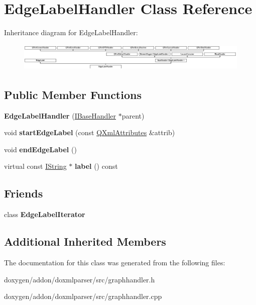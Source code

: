 \hypertarget{class_edge_label_handler}{}\section{Edge\+Label\+Handler Class Reference}
\label{class_edge_label_handler}
Inheritance diagram for Edge\+Label\+Handler\+:\begin{figure}[H]
\begin{center}
\leavevmode
\includegraphics[height=1.350211cm]{class_edge_label_handler}
\end{center}
\end{figure}
\subsection*{Public Member Functions}
\begin{DoxyCompactItemize}
\item 
\mbox{\label{class_edge_label_handler_af3e2f45cca8bea2c749237bd04036a5d}} 
{\bfseries Edge\+Label\+Handler} (\mbox{\hyperlink{class_i_base_handler}{I\+Base\+Handler}} $\ast$parent)
\item 
\mbox{\label{class_edge_label_handler_a30ece7f71374fb1436ad1fb8d0dfdde4}} 
void {\bfseries start\+Edge\+Label} (const \mbox{\hyperlink{class_q_xml_attributes}{Q\+Xml\+Attributes}} \&attrib)
\item 
\mbox{\label{class_edge_label_handler_a4e217720946ac0906a05db16909391b2}} 
void {\bfseries end\+Edge\+Label} ()
\item 
\mbox{\label{class_edge_label_handler_aff13f3bd4f53d9e76e4a0d7350319c7a}} 
virtual const \mbox{\hyperlink{class_i_string}{I\+String}} $\ast$ {\bfseries label} () const
\end{DoxyCompactItemize}
\subsection*{Friends}
\begin{DoxyCompactItemize}
\item 
\mbox{\label{class_edge_label_handler_af04914e6743dfa65bd97548d5db241fc}} 
class {\bfseries Edge\+Label\+Iterator}
\end{DoxyCompactItemize}
\subsection*{Additional Inherited Members}


The documentation for this class was generated from the following files\+:\begin{DoxyCompactItemize}
\item 
doxygen/addon/doxmlparser/src/graphhandler.\+h\item 
doxygen/addon/doxmlparser/src/graphhandler.\+cpp\end{DoxyCompactItemize}
